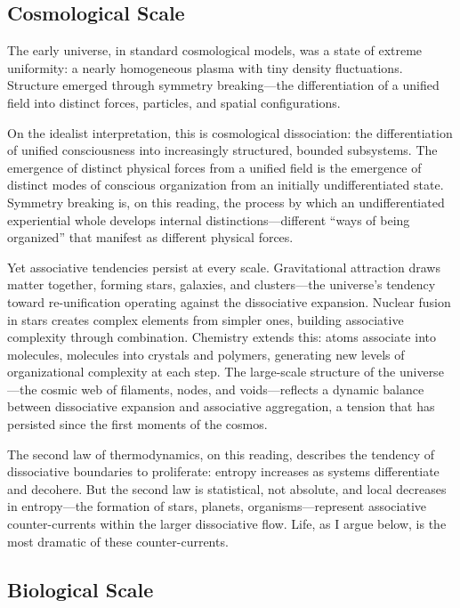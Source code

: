\documentclass[11pt,a4paper]{article}
\theoremstyle{definition}
\theoremstyle{plain}
\theoremstyle{remark}
\begin{document}
\subsection{Cosmological Scale}\label{sec:cosmological}

The early universe, in standard cosmological models, was a state of extreme uniformity: a nearly homogeneous plasma with tiny density fluctuations. Structure emerged through symmetry breaking---the differentiation of a unified field into distinct forces, particles, and spatial configurations.

On the idealist interpretation, this is cosmological dissociation: the differentiation of unified consciousness into increasingly structured, bounded subsystems. The emergence of distinct physical forces from a unified field is the emergence of distinct modes of conscious organization from an initially undifferentiated state. Symmetry breaking is, on this reading, the process by which an undifferentiated experiential whole develops internal distinctions---different ``ways of being organized'' that manifest as different physical forces.

Yet associative tendencies persist at every scale. Gravitational attraction draws matter together, forming stars, galaxies, and clusters---the universe's tendency toward re-unification operating against the dissociative expansion. Nuclear fusion in stars creates complex elements from simpler ones, building associative complexity through combination. Chemistry extends this: atoms associate into molecules, molecules into crystals and polymers, generating new levels of organizational complexity at each step. The large-scale structure of the universe---the cosmic web of filaments, nodes, and voids---reflects a dynamic balance between dissociative expansion and associative aggregation, a tension that has persisted since the first moments of the cosmos.

The second law of thermodynamics, on this reading, describes the tendency of dissociative boundaries to proliferate: entropy increases as systems differentiate and decohere. But the second law is statistical, not absolute, and local decreases in entropy---the formation of stars, planets, organisms---represent associative counter-currents within the larger dissociative flow. Life, as I argue below, is the most dramatic of these counter-currents.

\subsection{Biological Scale}\label{sec:biological}
\end{document}
